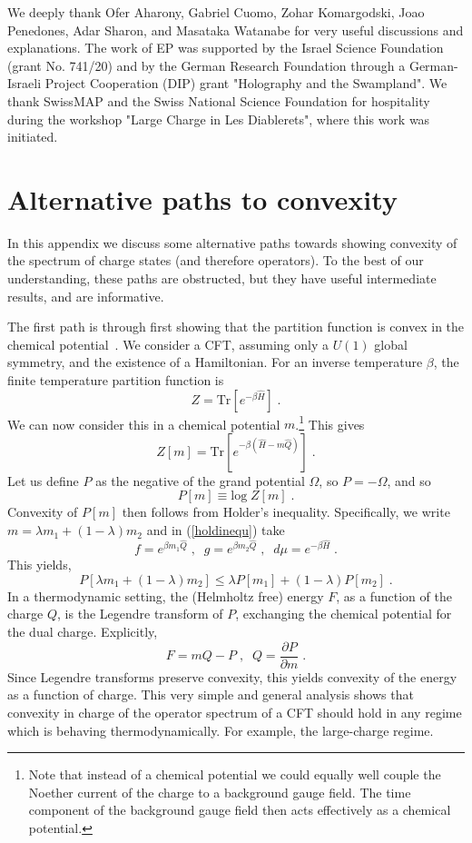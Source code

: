 \documentclass[11pt]{article}
\numberwithin{equation}{section}
\newcommand{\be}{\begin{equation}} \newcommand{\ee}{\end{equation}}
\begin{document}
		
	\vskip 20pt
	 We deeply thank Ofer Aharony, Gabriel Cuomo, Zohar Komargodski, Joao Penedones, Adar Sharon, and Masataka Watanabe for very useful discussions and explanations. The work of EP was supported by the Israel Science Foundation (grant No. 741/20) and by the German Research Foundation through a German-Israeli Project Cooperation (DIP) grant "Holography and the Swampland". We thank SwissMAP and the Swiss National Science Foundation for hospitality during the workshop "Large Charge in Les Diablerets", where this work was initiated. 
	
	
\appendix



	\section{Alternative paths to convexity}
	\label{sec:simpro}

In this appendix we discuss some alternative paths towards showing convexity of the spectrum of charge states (and therefore operators). To the best of our understanding, these paths are obstructed, but they have useful intermediate results, and are informative. 

The first path is through first showing that the partition function is convex in the chemical potential~\cite{Israel:1979}.
We consider a CFT, assuming only a $U(1)$ global symmetry, and the existence of a Hamiltonian. For an inverse temperature $\beta$, the finite temperature partition function is
	\be
	Z = \mathrm{Tr} \left[e^{-\beta \hat{H}} \right] \;.
	\ee
We can now consider this in a chemical potential $m$.\footnote{Note that instead of a chemical potential we could equally well couple the Noether current of the charge to a background gauge field. The time component of the background gauge field then acts effectively as a chemical potential.} This gives
	\be
	Z[m] = \mathrm{Tr} \left[e^{-\beta \left(\hat{H} - m \hat{Q} \right) } \right] \;.
	\ee
	Let us define $P$ as the negative of the grand potential $\Omega$, so $P=-\Omega$, and so
\be
 P[m] \equiv \mathrm{log\;}Z[m] \;.
 \ee
Convexity of $P[m]$ then follows from Holder's inequality. Specifically, we write $m = \lambda m_1 + \left(1-\lambda\right) m_2$ and in (\ref{holdinequ}) take 
\be
f = e^{\beta m_1 \hat{Q}} \;,\;\; g = e^{\beta m_2 \hat{Q}} \;,\;\; d\mu = e^{-\beta \hat{H}}\;.
\ee
This yields,
\be
P[\lambda m_1 + \left(1-\lambda\right) m_2] \leq \lambda P[m_1] + \left(1-\lambda \right)P[m_2]\;.
\ee
In a thermodynamic setting, the (Helmholtz free) energy $F$, as a function of the charge $Q$, is the Legendre transform of $P$, exchanging the chemical potential for the dual charge. Explicitly,
\be
F = m Q - P \;,\;\; Q = \frac{\partial P}{\partial m}\;.
\ee
Since Legendre transforms preserve convexity, this yields convexity of the energy as a function of charge. This very simple and general analysis shows that convexity in charge of the operator spectrum of a CFT should hold in any regime which is behaving thermodynamically. For example, the large-charge regime. 
\end{document}
